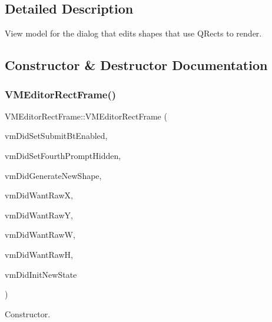 \subsection{Detailed Description}
View model for the dialog that edits shapes that use Q\+Rects to render. 



\subsection{Constructor \& Destructor Documentation}
\mbox{\label{class_v_m_editor_rect_frame_a72a9481e229b4ac80e62b1e5cd17eb1d}} 
\subsubsection{\texorpdfstring{VMEditorRectFrame()}{VMEditorRectFrame()}}
{\footnotesize\ttfamily V\+M\+Editor\+Rect\+Frame\+::\+V\+M\+Editor\+Rect\+Frame (\begin{DoxyParamCaption}\item[{std\+::function$<$ void(bool)$>$}]{vm\+Did\+Set\+Submit\+Bt\+Enabled,  }\item[{std\+::function$<$ void(bool)$>$}]{vm\+Did\+Set\+Fourth\+Prompt\+Hidden,  }\item[{std\+::function$<$ void(\mbox{\hyperlink{class_i_shape}{I\+Shape}} $\ast$)$>$}]{vm\+Did\+Generate\+New\+Shape,  }\item[{std\+::function$<$ Q\+String()$>$}]{vm\+Did\+Want\+RawX,  }\item[{std\+::function$<$ Q\+String()$>$}]{vm\+Did\+Want\+RawY,  }\item[{std\+::function$<$ Q\+String()$>$}]{vm\+Did\+Want\+RawW,  }\item[{std\+::function$<$ Q\+String()$>$}]{vm\+Did\+Want\+RawH,  }\item[{std\+::function$<$ void()$>$}]{vm\+Did\+Init\+New\+State }\end{DoxyParamCaption})}



Constructor. 


